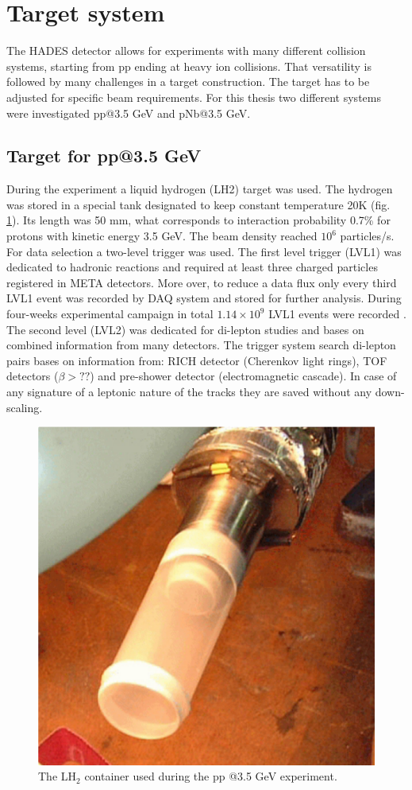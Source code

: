 \section{Target system}
The HADES detector allows for experiments with many different collision systems, starting from pp ending at heavy ion collisions. That versatility is followed by many challenges in a target construction. The target has to be adjusted for specific beam requirements. For this thesis two different systems were investigated pp@3.5 GeV and pNb@3.5 GeV.

\subsection{Target for pp@3.5 GeV}
During the experiment a liquid hydrogen (LH2) target was used. The hydrogen was stored in a special tank designated to keep constant temperature 20K (fig. \ref{fig:target}). Its length was 50 mm, what corresponds to interaction probability 0.7\% for protons with kinetic energy 3.5 GeV. The beam density reached $10^6$ particles/s. For data selection a two-level trigger was used. The first level trigger (LVL1) was dedicated to hadronic reactions and required at least three charged particles registered in META detectors. More over, to reduce a data flux only every third LVL1 event was recorded by DAQ system and stored for further analysis. During four-weeks experimental campaign in total $1.14 \times 10^9$ LVL1 events were recorded \cite{hades_inclL_35}. The second level (LVL2) was dedicated for di-lepton studies and bases on combined information from many detectors. The trigger system search di-lepton pairs bases on information from: RICH detector (Cherenkov light rings), TOF detectors ($\beta>??$) and pre-shower detector (electromagnetic cascade)\cite{Agakishiev:2009am,hades_DAQ}. In case of any signature of a leptonic nature of the tracks they are saved without any down-scaling.

\begin{figure}[ht]
  \centering{}
  \includegraphics[width=0.7 \linewidth]{Chapter_analysis/tarcza.eps}
  \caption{The LH$_2$ container used during the pp @3.5 GeV experiment.}
  \label{fig:target}
\end{figure}

